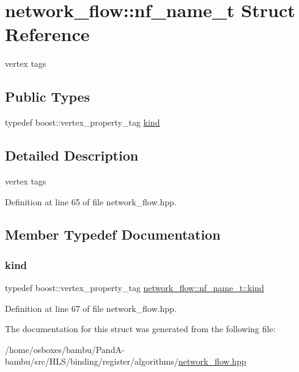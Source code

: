 \hypertarget{structnetwork__flow_1_1nf__name__t}{}\section{network\+\_\+flow\+:\+:nf\+\_\+name\+\_\+t Struct Reference}
\label{structnetwork__flow_1_1nf__name__t}


vertex tags  


\subsection*{Public Types}
\begin{DoxyCompactItemize}
\item 
typedef boost\+::vertex\+\_\+property\+\_\+tag \hyperlink{structnetwork__flow_1_1nf__name__t_a3c7a2ffaaab4a3e9e9db0bc33ecaa595}{kind}
\end{DoxyCompactItemize}


\subsection{Detailed Description}
vertex tags 

Definition at line 65 of file network\+\_\+flow.\+hpp.



\subsection{Member Typedef Documentation}
\mbox{\label{structnetwork__flow_1_1nf__name__t_a3c7a2ffaaab4a3e9e9db0bc33ecaa595}} 
\subsubsection{\texorpdfstring{kind}{kind}}
{\footnotesize\ttfamily typedef boost\+::vertex\+\_\+property\+\_\+tag \hyperlink{structnetwork__flow_1_1nf__name__t_a3c7a2ffaaab4a3e9e9db0bc33ecaa595}{network\+\_\+flow\+::nf\+\_\+name\+\_\+t\+::kind}}



Definition at line 67 of file network\+\_\+flow.\+hpp.



The documentation for this struct was generated from the following file\+:\begin{DoxyCompactItemize}
\item 
/home/osboxes/bambu/\+Pand\+A-\/bambu/src/\+H\+L\+S/binding/register/algorithms/\hyperlink{network__flow_8hpp}{network\+\_\+flow.\+hpp}\end{DoxyCompactItemize}
